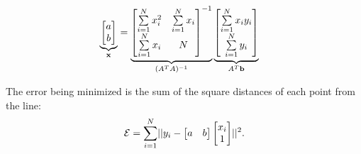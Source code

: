 \begin{problem}
\begin{enumroman}
\begin{answer}
        \begin{align*}
          \underbrace{\begin{bmatrix}
            a \\
            b
          \end{bmatrix}}_{\mathbf{x}}
          &=
          \underbrace{\begin{bmatrix}
            \sum\limits_{i=1}^N x_i^2 & \sum\limits_{i=1}^N x_i \\
            \sum\limits_{i=1}^N x_i & N
          \end{bmatrix}^{-1}}_{(A^T A)^{-1}}
          \underbrace{\begin{bmatrix}
            \sum\limits_{i=1}^N x_i y_i \\
            \sum\limits_{i=1}^N y_i
          \end{bmatrix}}_{A^T \mathbf{b}}
        \end{align*}

        \newpage
        The error being minimized is the sum of the square
        distances of each point from the line:
        \[ \mathcal{E} = \sum_{i=1}^N \lvert\lvert y_i - 
            \begin{bmatrix} a & b \end{bmatrix}
            \begin{bmatrix} x_i \\ 1 \end{bmatrix}\rvert
          \rvert^2. \]

        \begin{figure}[H]
          \centering
\end{figure}
\end{answer}
\end{enumroman}
\end{problem}
